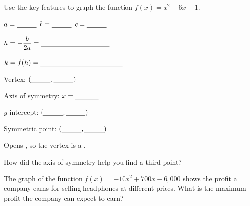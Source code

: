 \newpage

Use the key features to graph the function $f(x)=x^2-6x-1$.

\begin{minipage}[t]{0.50\textwidth}
\vspace{0pt}
$a=\blank[1cm]$ \quad $b=\blank[1cm]$ \quad $c=\blank[1cm]$

\vspace{6pt}
$h=-\dfrac{b}{2a}=\blank[3.5cm]$

\vspace{6pt}
$k=f(h)=\blank[4.2cm]$

\vspace{6pt}
Vertex: $(\blank[1cm],\blank[1cm])$

\vspace{6pt}
Axis of symmetry: $x=\blank[1.2cm]$

\vspace{6pt}
$y$-intercept: $(\blank[1cm],\blank[1cm])$

\vspace{6pt}
Symmetric point: $(\blank[1cm],\blank[1cm])$

\vspace{6pt}
Opens \blank[1.6cm], so the vertex is a \blank[2cm].
\end{minipage}\hfill
\begin{minipage}[t]{0.47\textwidth}
\vspace{0pt}
\end{minipage}

How did the axis of symmetry help you find a third point?\lines[1]

The graph of the function $f(x)=-10x^2+700x-6{,}000$ shows the profit a company earns for selling headphones at different prices. What is the maximum profit the company can expect to earn?

